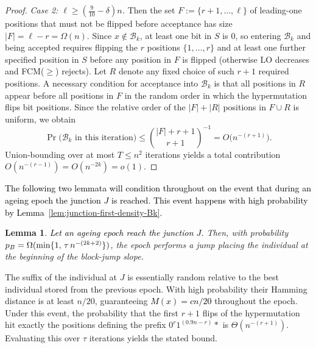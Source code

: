 \documentclass[lettersize,journal]{IEEEtran}
\newcommand{\new}[1]{\textcolor{black}{#1}}
\newtheorem{lemma}{Lemma}
\begin{document}
\begin{proof}
	\emph{Case 2: $\ell \ge (\tfrac{9}{10}-\delta)n$.}
	Then the set
	$F:=\{r{+}1,\dots,\ell\}$ of leading-one positions that must not be flipped before
	acceptance has size $|F|=\ell-r=\Omega(n)$.  Since $x\notin\mathcal{B}_k$, at
	least one bit in $S$ is $0$, so entering $\mathcal{B}_k$ and being accepted
	requires flipping the $r$ positions $\{1,\dots,r\}$ and at least one further
	specified position in $S$ before any position in $F$ is flipped (otherwise
	$\mathrm{LO}$ decreases and FCM($\ge$) rejects).  Let $R$ denote any fixed choice
	of such $r{+}1$ required positions.  A necessary condition for acceptance into
	$\mathcal{B}_k$ is that all positions in $R$ appear before all positions in $F$ in
	the random order in which the hypermutation flips bit positions.  Since the
	relative order of the $|F|+|R|$ positions in $F\cup R$ is uniform, we obtain
	\[
	\Pr\bigl(\mathcal{B}_k \text{ in this iteration}\bigr)
	\le
	\binom{|F|+r+1}{r+1}^{-1}
=
	O\!\bigl(n^{-(r+1)}\bigr).
	\]
	Union-bounding over at most $T\le n^2$ iterations yields a total contribution
	$O(n^{-(r-1)})=O(n^{-2k})=o(1)$.
	
\end{proof}

\textcolor{black}{The following two lemmata will condition throughout on the event that during an ageing epoch the junction $J$ is reached.
This event happens with high probability by Lemma~\ref{lem:junction-first-density-Bk}.}

\begin{lemma} \label{lem:BJO-epoch}
	\textcolor{black}{Let an ageing epoch reach the junction $J$.} Then, with probability $\new{p_B}=\Omega(\min\{1,\,\tau\,n^{-(2k+2)}\})$, the epoch performs a jump placing the individual at the beginning of the block-jump slope.
\end{lemma}

The suffix of the individual at $J$ is essentially random relative to the best individual stored from the 
previous epoch. 
With high probability their Hamming distance is at least $n/20$, guaranteeing 
\textcolor{black}{$M(x)= cn/20$} throughout the epoch.  
Under this event, the probability that the first $r+1$ flips of the hypermutation hit exactly the positions defining the prefix $0^{r}1^{(0.9n-r)} *$ is $\Theta(n^{-(r+1)})$.
Evaluating this over $\tau$ iterations yields the stated bound.
\end{document}

